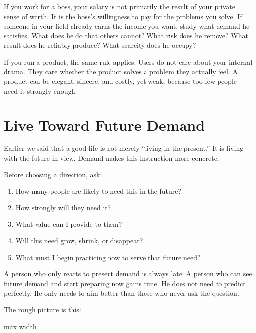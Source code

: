 If you work for a boss, your salary is not primarily the result of your private sense of worth. It is the boss's willingness to pay for the problems you solve. If someone in your field already earns the income you want, study what demand he satisfies. What does he do that others cannot? What risk does he remove? What result does he reliably produce? What scarcity does he occupy?

If you run a product, the same rule applies. Users do not care about your internal drama. They care whether the product solves a problem they actually feel. A product can be elegant, sincere, and costly, yet weak, because too few people need it strongly enough.

\section*{Live Toward Future Demand}

Earlier we said that a good life is not merely ``living in the present.'' It is living with the future in view. Demand makes this instruction more concrete.

Before choosing a direction, ask:

\begin{enumerate}
\item How many people are likely to need this in the future?
\item How strongly will they need it?
\item What value can I provide to them?
\item Will this need grow, shrink, or disappear?
\item What must I begin practicing now to serve that future need?
\end{enumerate}

A person who only reacts to present demand is always late. A person who can see future demand and start preparing now gains time. He does not need to predict perfectly. He only needs to aim better than those who never ask the question.

The rough picture is this:

\begin{center}
\begin{adjustbox}{max width=\linewidth}
\end{adjustbox}
\end{center}

